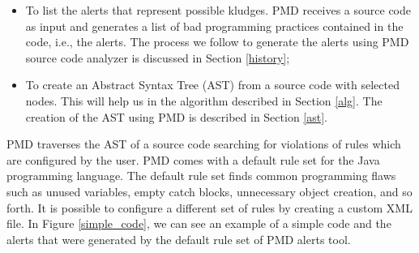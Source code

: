 \documentclass[
]{article}
\begin{document}
\begin{itemize}
\item To list the alerts that represent possible kludges. PMD receives 
a source code as input and generates a list of bad programming practices 
contained in the code, i.e., the alerts. The process we follow to 
generate the alerts using PMD source code analyzer is discussed in 
Section \ref{history};

\item To create an Abstract Syntax Tree (AST) from a source code with 
selected nodes. This will help us in the algorithm described in Section
\ref{alg}. The creation of the AST using PMD is described in Section
\ref{ast}.
\end{itemize}

PMD traverses the AST of a source code searching for violations of rules
which are configured by the user. PMD comes with a default rule set for
the Java programming language. The default rule set finds common programming flaws such as
unused variables, empty catch blocks, unnecessary object creation, and
so forth. It is possible to configure a different set of rules by creating a
custom XML file. In Figure \ref{simple_code}, we can see an example of a 
simple code and the alerts that were generated by the default rule set of
PMD alerts tool.
\end{document}
